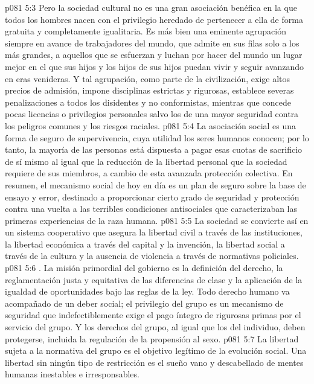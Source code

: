 \vs p081 5:3 Pero la sociedad cultural no es una gran asociación benéfica en la que todos los hombres nacen con el privilegio heredado de pertenecer a ella de forma gratuita y completamente igualitaria. Es más bien una eminente agrupación siempre en avance de trabajadores del mundo, que admite en sus filas solo a los más grandes, a aquellos que se esfuerzan y luchan por hacer del mundo un lugar mejor en el que sus hijos y los hijos de sus hijos puedan vivir y seguir avanzando en eras venideras. Y tal agrupación, como parte de la civilización, exige altos precios de admisión, impone disciplinas estrictas y rigurosas, establece severas penalizaciones a todos los disidentes y no conformistas, mientras que concede pocas licencias o privilegios personales salvo los de una mayor seguridad contra los peligros comunes y los riesgos raciales.
\vs p081 5:4 La asociación social es una forma de seguro de supervivencia, cuya utilidad los seres humanos conocen; por lo tanto, la mayoría de las personas está dispuesta a pagar esas cuotas de sacrificio de sí mismo al igual que la reducción de la libertad personal que la sociedad requiere de sus miembros, a cambio de esta avanzada protección colectiva. En resumen, el mecanismo social de hoy en día es un plan de seguro sobre la base de ensayo y error, destinado a proporcionar cierto grado de seguridad y protección contra una vuelta a las terribles condiciones antisociales que caracterizaban las primeras experiencias de la raza humana.
\vs p081 5:5 La sociedad se convierte así en un sistema cooperativo que asegura la libertad civil a través de las instituciones, la libertad económica a través del capital y la invención, la libertad social a través de la cultura y la ausencia de violencia a través de normativas policiales.
\vs p081 5:6 . La misión primordial del gobierno es la definición del derecho, la reglamentación justa y equitativa de las diferencias de clase y la aplicación de la igualdad de oportunidades bajo las reglas de la ley. Todo derecho humano va acompañado de un deber social; el privilegio del grupo es un mecanismo de seguridad que indefectiblemente exige el pago íntegro de rigurosas primas por el servicio del grupo. Y los derechos del grupo, al igual que los del individuo, deben protegerse, incluida la regulación de la propensión al sexo.
\vs p081 5:7 La libertad sujeta a la normativa del grupo es el objetivo legítimo de la evolución social. Una libertad sin ningún tipo de restricción es el sueño vano y descabellado de mentes humanas inestables e irresponsables.
